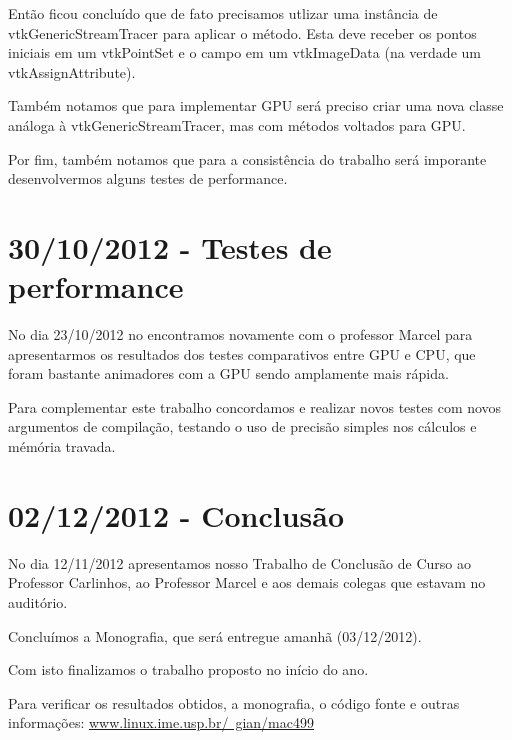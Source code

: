 \documentclass[a4paper,11pt]{report}
\begin{document}
Então ficou concluído que de fato precisamos utlizar uma instância de vtkGenericStreamTracer para aplicar o método. Esta deve receber os pontos iniciais em um vtkPointSet e o campo em um vtkImageData (na verdade um vtkAssignAttribute).

Também notamos que para implementar GPU será preciso criar uma nova classe análoga à vtkGenericStreamTracer, mas com métodos voltados para GPU.

Por fim, também notamos que para a consistência do trabalho será imporante desenvolvermos alguns testes de performance.

\section{30/10/2012 - Testes de performance}
No dia 23/10/2012 no encontramos novamente com o professor Marcel para apresentarmos os resultados dos testes comparativos entre GPU e CPU, que foram bastante animadores com a GPU sendo amplamente mais rápida.

Para complementar este trabalho concordamos e realizar novos testes com novos argumentos de compilação, testando o uso de precisão simples nos cálculos e mémória travada.

\section{02/12/2012 - Conclusão}
No dia 12/11/2012 apresentamos nosso Trabalho de Conclusão de Curso ao Professor Carlinhos, ao Professor Marcel e aos demais colegas que estavam no auditório.

Concluímos a Monografia, que será entregue amanhã (03/12/2012).

Com isto finalizamos o trabalho proposto no início do ano.

Para verificar os resultados obtidos, a monografia, o código fonte e outras informações:
\href{www.linux.ime.usp.br/~gian/mac499}{www.linux.ime.usp.br/~gian/mac499}
\end{document}
